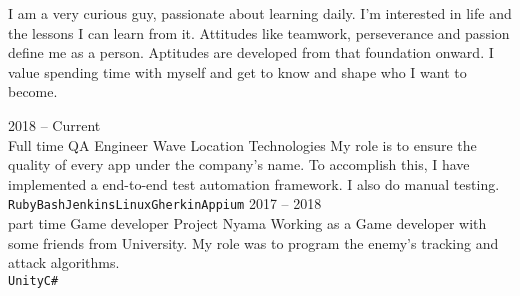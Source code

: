 \documentclass[9pt]{developercv} %
\begin{document}
\vspace{0.5cm}



\begin{minipage}[t]{0.4\textwidth} %
	\vspace{-\baselineskip} %
	
	I am a very curious guy, passionate about learning daily.
	I'm interested in life and the lessons I can learn from it.
	Attitudes like teamwork, perseverance and passion define me as a person.
	Aptitudes are developed from that foundation onward.
	I value spending time with myself and get to know and shape who I want to become.\\
\end{minipage}
\hfill %
\begin{minipage}[t]{0.5\textwidth} %
	\vspace{-\baselineskip} %
	\begin{barchart}{5.5}
	\end{barchart}
\end{minipage}



\begin{entrylist}
	\entry
		{2018 -- Current\\\footnotesize{Full time}}
		{QA Engineer}
		{Wave Location Technologies}
		{My role is to ensure the quality of every app under the company's name.
		To accomplish this, I have implemented a end-to-end test automation framework. I also do manual testing.\\ \texttt{Ruby}\slashsep\texttt{Bash}\slashsep\texttt{Jenkins}\slashsep\texttt{Linux}\slashsep\texttt{Gherkin}\slashsep\texttt{Appium}}
	\entry
		{2017 -- 2018\\\footnotesize{part time}}
		{Game developer}
		{Project Nyama}
		{Working as a Game developer with some friends from University.
		My role was to program the enemy's tracking and attack algorithms.\\ \texttt{Unity}\slashsep\texttt{C\#}}
\end{entrylist}
\end{document}
